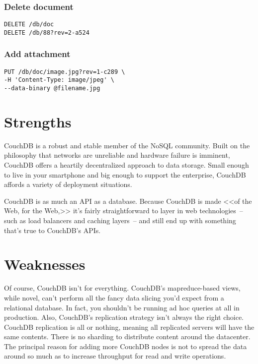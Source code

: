 \begin{multicols}{2}
\subsubsection{Delete document}
\begin{lstlisting}
DELETE /db/doc
DELETE /db/88?rev=2-a524
\end{lstlisting}

\subsubsection{Add attachment}
\begin{lstlisting}
PUT /db/doc/image.jpg?rev=1-c289 \
-H 'Content-Type: image/jpeg' \
--data-binary @filename.jpg
\end{lstlisting}

\end{multicols}

\section{Strengths}

CouchDB is a robust and stable member of the NoSQL community. Built on the philosophy that networks are unreliable and hardware failure is imminent, CouchDB offers a heartily decentralized approach to data storage. Small enough to live in your smartphone and big enough to support the enterprise, CouchDB affords a variety of deployment situations.

CouchDB is as much an API as a database. Because CouchDB is made <<of the Web, for the Web,>> it’s fairly straightforward to layer in web technologies~-- such as load balancers and caching layers~-- and still end up with something that's true to CouchDB's APIs.\cite{seven_databases}

\section{Weaknesses}

Of course, CouchDB isn't for everything. CouchDB's mapreduce-based views, while novel, can't perform all the fancy data slicing you'd expect from a relational database. In fact, you shouldn't be running ad hoc queries at all in production. Also, CouchDB's replication strategy isn't always the right choice. CouchDB replication is all or nothing, meaning all replicated servers will have the same contents. There is no sharding to distribute content around the datacenter. The principal reason for adding more CouchDB nodes is not to spread the data around so much as to increase throughput for read and write operations.\cite{seven_databases}

